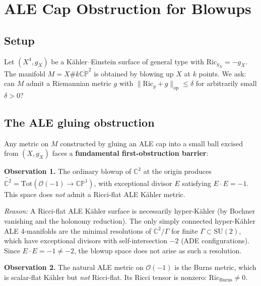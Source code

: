 
\section{ALE Cap Obstruction for Blowups}

\subsection{Setup}

Let $(X^4, g_X)$ be a Kähler--Einstein surface of general type with $\mathrm{Ric}_{g_X} = -g_X$.
The manifold $M = X \# k\overline{\mathbb{CP}}^2$ is obtained by blowing up $X$ at $k$ points.
We ask: can $M$ admit a Riemannian metric $g$ with $\|\mathrm{Ric}_g + g\|_{\mathrm{op}} \leq \delta$
for arbitrarily small $\delta > 0$?

\subsection{The ALE gluing obstruction}

Any metric on $M$ constructed by gluing an ALE cap into a small ball excised from $(X, g_X)$
faces a \textbf{fundamental first-obstruction barrier}:

\textbf{Observation 1.} The ordinary blowup of $\mathbb{C}^2$ at the origin produces
$\widetilde{\mathbb{C}^2} = \mathrm{Tot}(\mathcal{O}(-1) \to \mathbb{CP}^1)$, with 
exceptional divisor $E$ satisfying $E \cdot E = -1$. This space does \emph{not} admit
a Ricci-flat ALE Kähler metric.

\textit{Reason:} A Ricci-flat ALE Kähler surface is necessarily hyper-Kähler (by Bochner
vanishing and the holonomy reduction). The only simply connected hyper-Kähler ALE 4-manifolds
are the minimal resolutions of $\mathbb{C}^2/\Gamma$ for finite $\Gamma \subset \mathrm{SU}(2)$,
which have exceptional divisors with self-intersection $-2$ (ADE configurations).
Since $E \cdot E = -1 \neq -2$, the blowup space does not arise as such a resolution.

\textbf{Observation 2.} The natural ALE metric on $\mathcal{O}(-1)$ is the Burns metric,
which is scalar-flat Kähler but \emph{not} Ricci-flat. Its Ricci tensor is nonzero:
$\mathrm{Ric}_{\text{Burns}} \neq 0$.

